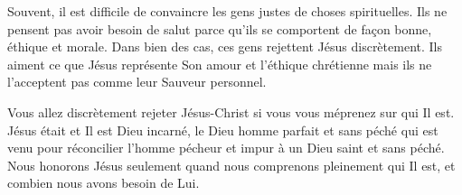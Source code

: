Souvent, il est difficile de convaincre les gens justes de choses spirituelles. Ils ne pensent pas avoir besoin de salut parce qu'ils se comportent de façon bonne, éthique et morale. Dans bien des cas, ces gens rejettent Jésus discrètement. Ils aiment ce que Jésus représente \ocadr Son amour et l'éthique chrétienne \fcadr{} mais ils ne l'acceptent pas comme leur Sauveur personnel.


Vous allez discrètement rejeter Jésus-Christ si vous vous méprenez sur qui Il est. Jésus était et Il est Dieu incarné, le Dieu homme parfait et sans péché qui est venu pour réconcilier l'homme pécheur et impur à un Dieu saint et sans péché. Nous honorons Jésus seulement quand nous comprenons pleinement qui Il est, et combien nous avons besoin de Lui.


\begin{dvquotes}


\end{dvquotes}



